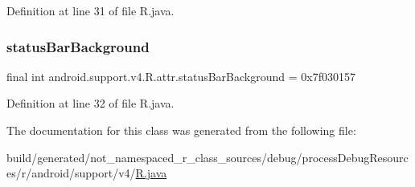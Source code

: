 Definition at line 31 of file R.\+java.

\mbox{\label{classandroid_1_1support_1_1v4_1_1_r_1_1attr_aa59473f9f702e6a039b2abe1820fc4b7}} 
\subsubsection{\texorpdfstring{statusBarBackground}{statusBarBackground}}
{\footnotesize\ttfamily final int android.\+support.\+v4.\+R.\+attr.\+status\+Bar\+Background = 0x7f030157\hspace{0.3cm}{\ttfamily [static]}}



Definition at line 32 of file R.\+java.



The documentation for this class was generated from the following file\+:\begin{DoxyCompactItemize}
\item 
build/generated/not\+\_\+namespaced\+\_\+r\+\_\+class\+\_\+sources/debug/process\+Debug\+Resources/r/android/support/v4/\mbox{\hyperlink{android_2support_2v4_2_r_8java}{R.\+java}}\end{DoxyCompactItemize}
